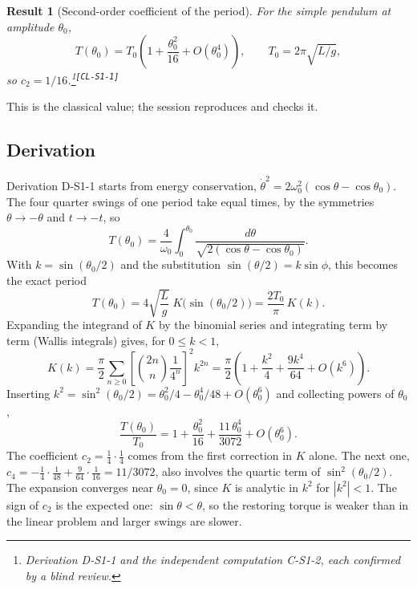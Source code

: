 \documentclass[11pt]{article}
\newtheorem{result}{Result}
\newcommand{\card}[1]{\textsuperscript{\texttt{[#1]}}}
\begin{document}
\begin{result}[Second-order coefficient of the period]
For the simple pendulum at amplitude $\theta_0$,
\begin{equation}
  T(\theta_0) = T_0\left(1 + \frac{\theta_0^2}{16} + O(\theta_0^4)\right),
  \qquad T_0 = 2\pi\sqrt{L/g},
  \label{eq:result}
\end{equation}
so $c_2 = 1/16$.\footnote{Derivation D-S1-1 and the independent computation
C-S1-2, each confirmed by a blind review.}\card{CL-S1-1}
\end{result}

This is the classical value; the session reproduces and checks it.

\subsection{Derivation}
Derivation D-S1-1 starts from energy conservation,
$\dot\theta^2 = 2\omega_0^2(\cos\theta - \cos\theta_0)$. The four quarter
swings of one period take equal times, by the symmetries
$\theta \to -\theta$ and $t \to -t$, so
\begin{equation}
  T(\theta_0) = \frac{4}{\omega_0}\int_0^{\theta_0}
  \frac{d\theta}{\sqrt{2(\cos\theta - \cos\theta_0)}} .
\end{equation}
With $k = \sin(\theta_0/2)$ and the substitution $\sin(\theta/2) = k\sin\phi$,
this becomes the exact period
\begin{equation}
  T(\theta_0) = 4\sqrt{\frac{L}{g}}\;K\bigl(\sin(\theta_0/2)\bigr)
  = \frac{2T_0}{\pi}\,K(k).
  \label{eq:exact}
\end{equation}
Expanding the integrand of $K$ by the binomial series and integrating term by
term (Wallis integrals) gives, for $0 \le k < 1$,
\begin{equation}
  K(k) = \frac{\pi}{2}\sum_{n \ge 0}\left[\binom{2n}{n}\frac{1}{4^n}\right]^2 k^{2n}
  = \frac{\pi}{2}\left(1 + \frac{k^2}{4} + \frac{9k^4}{64} + O(k^6)\right).
  \label{eq:Kseries}
\end{equation}
Inserting $k^2 = \sin^2(\theta_0/2) = \theta_0^2/4 - \theta_0^4/48 + O(\theta_0^6)$
and collecting powers of $\theta_0$,
\begin{equation}
  \frac{T(\theta_0)}{T_0} = 1 + \frac{\theta_0^2}{16} + \frac{11\,\theta_0^4}{3072}
  + O(\theta_0^6).
  \label{eq:series}
\end{equation}
The coefficient $c_2 = \tfrac14\cdot\tfrac14$ comes from the first correction
in $K$ alone. The next one,
$c_4 = -\tfrac14\cdot\tfrac{1}{48} + \tfrac{9}{64}\cdot\tfrac{1}{16} = 11/3072$,
also involves the quartic term of $\sin^2(\theta_0/2)$. The expansion converges
near $\theta_0 = 0$, since $K$ is analytic in $k^2$ for $|k^2| < 1$. The sign
of $c_2$ is the expected one: $\sin\theta < \theta$, so the restoring torque is
weaker than in the linear problem and larger swings are slower.
\end{document}
